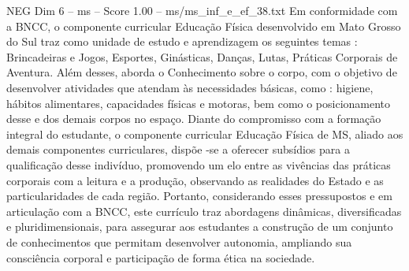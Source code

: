 \begin{textsample}{NEG Dim 6 – ms – Score 1.00 – ms/ms\_inf\_e\_ef\_38.txt}
Em conformidade com a BNCC, o componente curricular Educação Física desenvolvido em Mato Grosso do Sul traz como unidade de estudo e aprendizagem os seguintes temas : Brincadeiras e Jogos, Esportes, Ginásticas, Danças, Lutas, Práticas Corporais de Aventura.
Além desses, aborda o Conhecimento sobre o corpo, com o objetivo de desenvolver atividades que atendam às necessidades básicas, como : higiene, hábitos alimentares, capacidades físicas e motoras, bem como o posicionamento desse e dos demais corpos no espaço.
Diante do compromisso com a formação integral do estudante, o componente curricular Educação Física de MS, aliado aos demais componentes curriculares, dispõe -se a oferecer subsídios para a qualificação desse indivíduo, promovendo um elo entre as vivências das práticas corporais com a leitura e a produção, observando as realidades do Estado e as particularidades de cada região.
Portanto, considerando esses pressupostos e em articulação com a BNCC, este currículo traz abordagens dinâmicas, diversificadas e pluridimensionais, para assegurar aos estudantes a construção de um conjunto de conhecimentos que permitam desenvolver autonomia, ampliando sua consciência corporal e participação de forma ética na sociedade.

\end{textsample}

